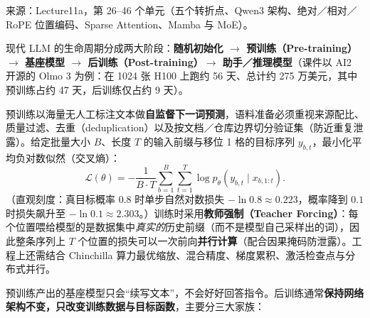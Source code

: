 来源：Lecture11a，第 26–46 个单元（五个转折点、Qwen3 架构、绝对／相对／RoPE 位置编码、Sparse Attention、Mamba 与 MoE）。



现代 LLM 的生命周期分成两大阶段：\textbf{随机初始化 \ensuremath{\to} 预训练（Pre-training）\ensuremath{\to} 基座模型 \ensuremath{\to} 后训练（Post-training）\ensuremath{\to} 助手／推理模型}（课件以 AI2 开源的 Olmo 3 为例：在 1024 张 H100 上跑约 56 天、总计约 275 万美元，其中预训练占约 47 天，后训练仅占约 9 天）。


预训练以海量无人工标注文本做\textbf{自监督下一词预测}，语料准备必须重视来源配比、质量过滤、去重（deduplication）以及按文档／仓库边界切分验证集（防近重复泄露）。给定批量大小 $B$、长度 $T$ 的输入前缀与移位 1 格的目标序列 $y_{b,t}$，最小化平均负对数似然（交叉熵）：
\[
\mathcal{L}(\theta) = -\frac{1}{B\cdot T}\sum_{b=1}^B\sum_{t=1}^T \log p_\theta(y_{b,t}\mid x_{b,1:t}).
\tag{11.3}
\]
（直观刻度：真目标概率 $0.8$ 时单步自然对数损失 $-\ln 0.8\approx 0.223$，概率降到 $0.1$ 时损失飙升至 $-\ln 0.1\approx 2.303$。）训练时采用\textbf{教师强制（Teacher Forcing）}：每个位置喂给模型的是数据集中\emph{真实的}历史前缀（而不是模型自己采样出的词），因此整条序列上 $T$ 个位置的损失可以一次前向\textbf{并行计算}（配合因果掩码防泄露）。工程上还需结合 Chinchilla 算力最优缩放、混合精度、梯度累积、激活检查点与分布式并行。


预训练产出的基座模型只会“续写文本”，不会好好回答指令。后训练通常\textbf{保持网络架构不变，只改变训练数据与目标函数}，主要分三大家族：

